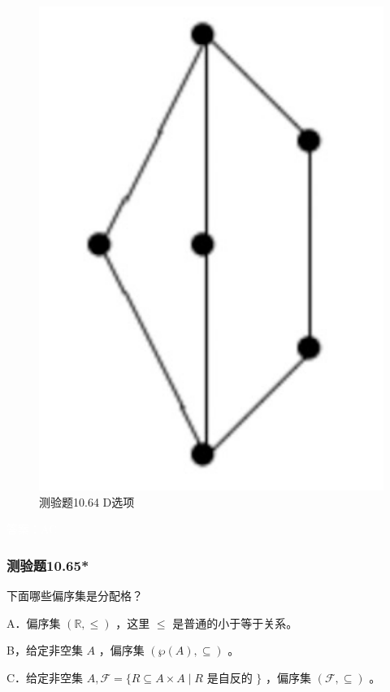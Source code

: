 \documentclass[UTF8, heading=true]{ctexart}
\begin{document}
\begin{figure}[H]
\begin{minipage}[t]{0.2\textwidth}
      \includegraphics[width=1\textwidth]{10.64_4.jpg} %
      \vspace{-0.3cm}
      \caption{测验题10.64 D选项}
\end{minipage}
\end{figure}

\textcolor{white}{答案：AC}

\subsubsection{测验题10.65*}

下面哪些偏序集是分配格？

A．偏序集 $(\mathbb{R}, \leq)$ ，这里 $\leq$ 是普通的小于等于关系。

B，给定非空集 $A$ ，偏序集 $(\wp(A), \subseteq)$ 。

C．给定非空集 $A, \mathcal{F}=\{R \subseteq A \times A \mid R$ 是自反的 $\}$ ，偏序集 $(\mathcal{F}, \subseteq)$ 。
\end{document}

